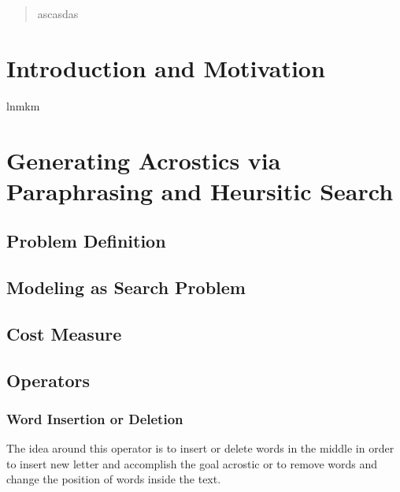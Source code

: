 \documentclass{reportAlternative}
\begin{document}
\begin{abstract}
ascasdas
\end{abstract}

\chapter{Introduction and Motivation}
lnmkm
\chapter{Generating Acrostics via Paraphrasing and Heursitic Search}

\section{Problem Definition}

\section{Modeling as Search Problem}

\section{Cost Measure}

\section{Operators}
\subsection{Word Insertion or Deletion}
The idea around this operator is to insert or delete words in the middle in order to insert new letter and accomplish the goal acrostic or to remove words and change the position of words inside the text. \par
\end{document}
